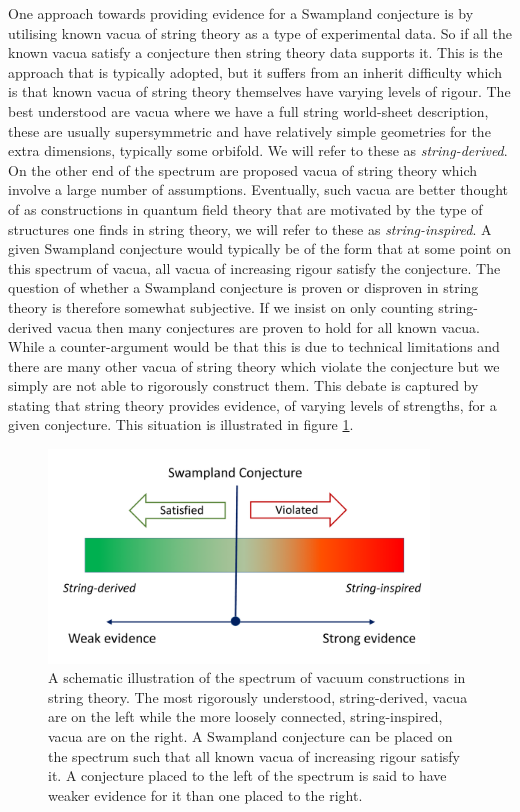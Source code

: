 \documentclass[11pt,a4paper]{article}
\numberwithin{equation}{section}
\numberwithin{table}{section}\setlength{\multlinegap}{25pt}
\begin{document}
One approach towards providing evidence for a Swampland conjecture is by utilising known vacua of string theory as a type of experimental data. So if all the known vacua satisfy a conjecture then string theory data supports it. This is the approach that is typically adopted, but it suffers from an inherit difficulty which is that known vacua of string theory themselves have varying levels of rigour. The best understood are vacua where we have a full string world-sheet description, these are usually supersymmetric and have relatively simple geometries for the extra dimensions, typically some orbifold. We will refer to these as {\it string-derived}. On the other end of the spectrum are proposed vacua of string theory which involve a large number of assumptions. Eventually, such vacua are better thought of as constructions in quantum field theory that are motivated by the type of structures one finds in string theory, we will refer to these as {\it string-inspired}. A given Swampland conjecture would typically be of the form that at some point on this spectrum of vacua, all vacua of increasing rigour satisfy the conjecture. The question of whether a Swampland conjecture is proven or disproven in string theory is therefore somewhat subjective. If we insist on only counting string-derived vacua then many conjectures are proven to hold for all known vacua. While a counter-argument would be that this is due to technical limitations and there are many other vacua of string theory which violate the conjecture but we simply are not able to rigorously construct them. This debate is captured by stating that string theory provides evidence, of varying levels of strengths, for a given conjecture. This situation is illustrated in figure \ref{fig:ss}.
\begin{figure}[t]
\centering
 \includegraphics[width=0.9\textwidth]{sspec.pdf}
\caption{A schematic illustration of the spectrum of vacuum constructions in string theory. The most rigorously understood, string-derived, vacua are on the left while the more loosely connected, string-inspired, vacua are on the right. A Swampland conjecture can be placed on the spectrum such that all known vacua of increasing rigour satisfy it. A conjecture placed to the left of the spectrum is said to have weaker evidence for it than one placed to the right.}
\label{fig:ss}
\end{figure}
\end{document}
